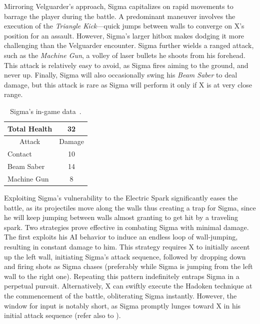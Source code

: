 Mirroring Velguarder's approach, Sigma capitalizes on rapid movements to barrage the player during the battle. A predominant maneuver involves the execution of the \emph{Triangle Kick}—quick jumps between walls to converge on X's position for an assault. However, Sigma's larger hitbox makes dodging it more challenging than the Velguarder encounter. Sigma further wields a ranged attack, such as the \emph{Machine Gun}, a volley of laser bullets he shoots from his forehead. This attack is relatively easy to avoid, as Sigma fires aiming to the ground, and never up. Finally, Sigma will also occasionally swing his \emph{Beam Saber} to deal damage, but this attack is rare as Sigma will perform it only if X is at very close range.
\begin{table}[htp]
	\centering  
	\begin{tabular}[h]{l c}
		\toprule
		Total Health  & 32\\
		\midrule
		\multicolumn{1}{c}{Attack} & \multicolumn{1}{c}{Damage}\\
		Contact & 10\\
		Beam Saber & 14\\
		Machine Gun& 8\\
		\bottomrule
	\end{tabular}
	\caption{Sigma's in-game data~\cite{wiki:Sigma,book:Compendium}.}
\end{table}

Exploiting Sigma's vulnerability to the Electric Spark significantly eases the battle, as its projectiles move along the walls thus creating a trap for Sigma, since he will keep jumping between walls almost granting to get hit by a traveling spark. Two strategies prove effective in combating Sigma with minimal damage. The first exploits his AI behavior to induce an endless loop of wall-jumping, resulting in constant damage to him. This strategy requires  X to initially ascent up the left wall, initiating Sigma's attack sequence, followed by dropping down and firing shots as Sigma chases (preferably while Sigma is jumping from the left wall to the right one). Repeating this pattern indefinitely entraps Sigma in a perpetual pursuit. Alternatively, X can swiftly execute the Hadoken technique at the commencement of the battle, obliterating Sigma instantly. However, the window for input is notably short, as Sigma promptly lunges toward X in his initial attack sequence (refer also to ).



